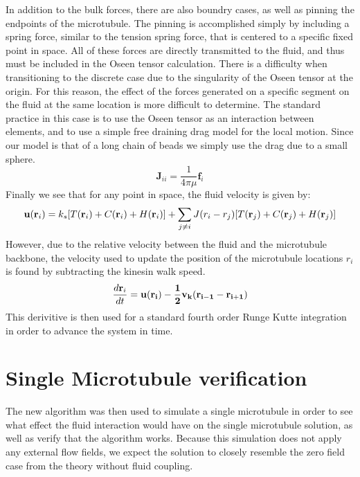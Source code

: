 \documentclass[11pt]{ucthesis}
\def\br{{\bf r}}
\begin{document}
In addition to the bulk forces, there are also boundry cases, as well as pinning the endpoints of the microtubule. The pinning is accomplished simply by including a spring force, similar to the tension spring force, that is centered to a specific fixed point in space.
All of these forces are directly transmitted to the fluid, and thus must be included in the Oseen tensor calculation. There is a difficulty when transitioning to the discrete case due to the singularity of the Oseen tensor at the origin. 
For this reason, the effect of the forces generated on a specific segment on the fluid at the same location is more difficult to determine.
The standard practice in this case is to use the Oseen tensor as an interaction between elements, and to use a simple free draining drag model for the local motion. Since our model is that of a long chain of beads we simply use the drag due to a small sphere.
\begin{equation}
\label{eq:discretesum}
\mathbf{J}_{ii} = \frac{1}{4\pi\mu} \mathbf{f}_i
\end{equation}
Finally we see that for any point in space, the fluid velocity is given by:
\begin{equation}
\label{eq:discretesum}
\mathbf{u}(\br_i) = k_s[T(\br_i) + C(\br_i) + H(\br_i)] + \sum_{j\neq i} J(r_i - r_j) [T(\br_j) + C(\br_j)+ H(\br_j)]
\end{equation}
However, due to the relative velocity between the fluid and the microtubule backbone, the velocity used to update the position of the microtubule locations $r_i$ is found by subtracting the kinesin walk speed.
\begin{equation}
\label{eq:discretevel}
\frac{d \br_i}{dt} = \bf u(\br_i) - \frac{1}{2}v_k (\br_{i-1} - \br_{i+1})
\end{equation}
This derivitive is then used for a standard fourth order Runge Kutte integration in order to advance the system in time.

\section{Single Microtubule verification}
The new algorithm was then used to simulate a single microtubule in order to see what effect the fluid interaction would have on the single microtubule solution, as well as verify that the algorithm works.
Because this simulation does not apply any external flow fields, we expect the solution to closely resemble the zero field case from the theory without fluid coupling.
\end{document}
